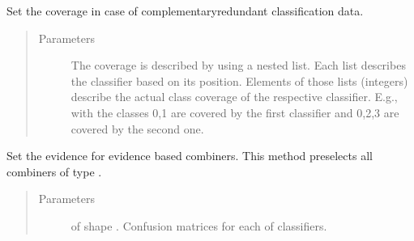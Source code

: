 \documentclass[letterpaper,10pt,english]{sphinxmanual}
\begin{document}
\begin{fulllineitems}
\begin{fulllineitems}
\end{fulllineitems}


\begin{fulllineitems}
\label{\detokenize{pusion.auto.auto_combiner:pusion.auto.auto_combiner.AutoCombiner.set_coverage}}
\sphinxAtStartPar
Set the coverage in case of complementary\sphinxhyphen{}redundant classification data.
\begin{quote}\begin{description}
\item[{Parameters}] \leavevmode
\sphinxAtStartPar
{} \textendash{} The coverage is described by using a nested list. Each list describes the classifier based on
its position. Elements of those lists (integers) describe the actual class coverage of the respective
classifier. E.g., with \sphinxcode{\sphinxupquote{{[}{[}0,1{]}, {[}0,2,3{]}{]}}} the classes 0,1 are covered by the first classifier and
0,2,3 are covered by the second one.

\end{description}\end{quote}

\end{fulllineitems}


\begin{fulllineitems}
\label{\detokenize{pusion.auto.auto_combiner:pusion.auto.auto_combiner.AutoCombiner.set_evidence}}
\sphinxAtStartPar
Set the evidence for evidence based combiners. This method preselects all combiners of type
.
\begin{quote}\begin{description}
\item[{Parameters}] \leavevmode
\sphinxAtStartPar
{} \textendash{}  of shape .
Confusion matrices for each of  classifiers.


\end{description}
\end{quote}
\end{fulllineitems}
\end{fulllineitems}
\end{document}
